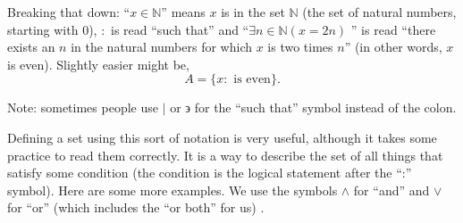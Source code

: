 \documentclass[10pt,]{book}
\theoremstyle{plain}
\theoremstyle{definition}
\theoremstyle{definition}
\theoremstyle{definition}
\def\N{\mathbb N}
\def\st{:}
\begin{document}
      Breaking that down: ``\(x \in \N\)'' means \(x\) is in the set \(\N\) \label{notation-1}
 (the set of natural numbers, starting with 0), \(:\) \label{notation-2}
      is read ``such that'' and ``\(\exists n\in \N (x = 2n) \)
      '' is read ``there exists an \(n\) in the natural numbers for which \(x\) is two times \(n\)'' (in other words, \(x\) is even). Slightly easier might be,
      \begin{equation*}
        A = \{x \st \mbox{  is even} \}.
      \end{equation*}
\par

      Note: sometimes people use \(|\) or \(\backepsilon\) for the ``such that'' symbol instead of the colon.
\par

      Defining a set using this sort of notation is very useful, although it takes some practice to read them correctly. It is a way to describe the set of all things that satisfy some condition (the condition is the logical statement after the ``:''      symbol). Here are some more examples. We use the symbols \(\wedge\) for ``and'' and \(\vee\) for ``or'' (which includes the ``or both'' for us)
      .
\end{document}
